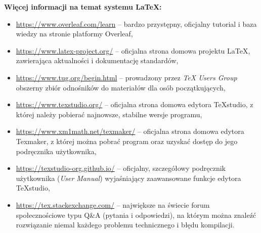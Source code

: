 \noindent \textbf{Więcej informacji na temat systemu \LaTeX{}:}
\begin{itemize}
	\item \url{https://www.overleaf.com/learn} -- bardzo przystępny, oficjalny tutorial i baza wiedzy na stronie platformy Overleaf,
	
	\item \url{https://www.latex-project.org/} -- oficjalna strona domowa projektu \LaTeX{}, zawierająca aktualności i dokumentację standardów,
	
	\item \url{https://www.tug.org/begin.html} -- prowadzony przez \textit{\TeX{} Users Group} obszerny zbiór odnośników do materiałów dla osób początkujących,
	
	\item \url{https://www.texstudio.org/} -- oficjalna strona domowa edytora TeXstudio, z której należy pobierać najnowsze, stabilne wersje programu,
	
	\item \url{https://www.xm1math.net/texmaker/} -- oficjalna strona domowa edytora Texmaker, z której można pobrać program oraz uzyskać dostęp do jego podręcznika użytkownika,

	\item \url{https://texstudio-org.github.io/} -- oficjalny, szczegółowy podręcznik użytkownika (\textit{User Manual}) wyjaśniający zaawansowane funkcje edytora TeXstudio,
	
	\item \url{https://tex.stackexchange.com/} -- największe na świecie forum społecznościowe typu Q\&A (pytania i odpowiedzi), na którym można znaleźć rozwiązanie niemal każdego problemu technicznego i błędu kompilacji.
\end{itemize}
